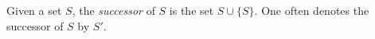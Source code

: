 \documentclass{article}
\begin{document}
Given a set $S$, the {\em successor} of $S$ is the set $S \cup \{S\}$. One often denotes the successor of $S$ by $S'$.
\end{document}
